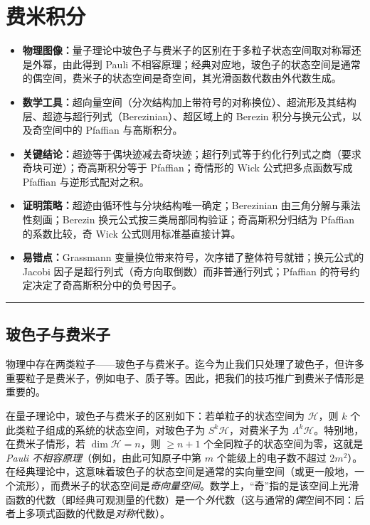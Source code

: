 \section{费米积分}

\begin{keytakeaways}
\begin{itemize}
  \item \textbf{物理图像：}量子理论中玻色子与费米子的区别在于多粒子状态空间取对称幂还是外幂，由此得到 Pauli 不相容原理；经典对应地，玻色子的状态空间是通常的偶空间，费米子的状态空间是奇空间，其光滑函数代数由外代数生成。
  \item \textbf{数学工具：}超向量空间（分次结构加上带符号的对称换位）、超流形及其结构层、超迹与超行列式（Berezinian）、超区域上的 Berezin 积分与换元公式，以及奇空间中的 Pfaffian 与高斯积分。
  \item \textbf{关键结论：}超迹等于偶块迹减去奇块迹；超行列式等于约化行列式之商（要求奇块可逆）；奇高斯积分等于 Pfaffian；奇情形的 Wick 公式把多点函数写成 Pfaffian 与逆形式配对之积。
  \item \textbf{证明策略：}超迹由循环性与分块结构唯一确定；Berezinian 由三角分解与乘法性刻画；Berezin 换元公式按三类局部同构验证；奇高斯积分归结为 Pfaffian 的系数比较，奇 Wick 公式则用标准基直接计算。
  \item \textbf{易错点：}Grassmann 变量换位带来符号，次序错了整体符号就错；换元公式的 Jacobi 因子是超行列式（奇方向取倒数）而非普通行列式；Pfaffian 的符号约定决定了奇高斯积分中的负号因子。
\end{itemize}
\end{keytakeaways}

\bigskip
\noindent\rule{\textwidth}{0.6pt}
\bigskip

\subsection{玻色子与费米子}

物理中存在两类粒子——玻色子与费米子。迄今为止我们只处理了玻色子，但许多重要粒子是费米子，例如电子、质子等。因此，把我们的技巧推广到费米子情形是重要的。

在量子理论中，玻色子与费米子的区别如下：若单粒子的状态空间为 ${\mathcal H}$，则 $k$ 个此类粒子组成的系统的状态空间，对玻色子为 $S^k{\mathcal H}$，对费米子为 $\Lambda^k{\mathcal H}$。特别地，在费米子情形，若 $\dim \mathcal H=n$，则 $\ge n+1$ 个全同粒子的状态空间为零，这就是\emph{Pauli 不相容原理}（例如，由此可知原子中第 $m$ 个能级上的电子数不超过 $2m^2$）。在经典理论中，这意味着玻色子的状态空间是通常的实向量空间（或更一般地，一个流形），而费米子的状态空间是\emph{奇向量空间}。数学上，“奇”指的是该空间上光滑函数的代数（即经典可观测量的代数）是一个\emph{外}代数（这与通常的\emph{偶}空间不同：后者上多项式函数的代数是\emph{对称}代数）。

